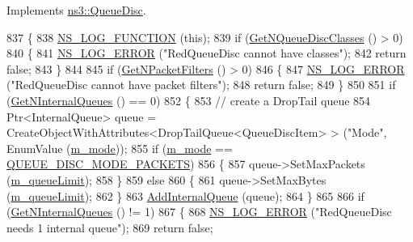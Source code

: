 Implements \hyperlink{classns3_1_1QueueDisc_ace6ef0c9afd0954c4629ad454bf975f5}{ns3\+::\+Queue\+Disc}.


\begin{DoxyCode}
837 \{
838   \hyperlink{log-macros-disabled_8h_a90b90d5bad1f39cb1b64923ea94c0761}{NS\_LOG\_FUNCTION} (\textcolor{keyword}{this});
839   \textcolor{keywordflow}{if} (\hyperlink{classns3_1_1QueueDisc_a8165c6afde992b073bc4d3bb283ed138}{GetNQueueDiscClasses} () > 0)
840     \{
841       \hyperlink{group__logging_ga0261a8db1d4ac5f79417d117634fd455}{NS\_LOG\_ERROR} (\textcolor{stringliteral}{"RedQueueDisc cannot have classes"});
842       \textcolor{keywordflow}{return} \textcolor{keyword}{false};
843     \}
844 
845   \textcolor{keywordflow}{if} (\hyperlink{classns3_1_1QueueDisc_aff24dd5be3fe3aa46b88c00659e09b23}{GetNPacketFilters} () > 0)
846     \{
847       \hyperlink{group__logging_ga0261a8db1d4ac5f79417d117634fd455}{NS\_LOG\_ERROR} (\textcolor{stringliteral}{"RedQueueDisc cannot have packet filters"});
848       \textcolor{keywordflow}{return} \textcolor{keyword}{false};
849     \}
850 
851   \textcolor{keywordflow}{if} (\hyperlink{classns3_1_1QueueDisc_a98e658dc1b0b32104ffc9e07afd205c6}{GetNInternalQueues} () == 0)
852     \{
853       \textcolor{comment}{// create a DropTail queue}
854       Ptr<InternalQueue> queue = CreateObjectWithAttributes<DropTailQueue<QueueDiscItem> > (\textcolor{stringliteral}{"Mode"}, 
      EnumValue (\hyperlink{classns3_1_1RedQueueDisc_aaff7adacb9ec0949e8e867fa27ea6c2c}{m\_mode}));
855       \textcolor{keywordflow}{if} (\hyperlink{classns3_1_1RedQueueDisc_aaff7adacb9ec0949e8e867fa27ea6c2c}{m\_mode} == \hyperlink{classns3_1_1RedQueueDisc_addca87c9127669da12f19adfe7d14a30a116c76aa54c1388fc5c2d75cebf577d3}{QUEUE\_DISC\_MODE\_PACKETS})
856         \{
857           queue->SetMaxPackets (\hyperlink{classns3_1_1RedQueueDisc_a421aec8e4b8cca06d16bfc5f8def2623}{m\_queueLimit});
858         \}
859       \textcolor{keywordflow}{else}
860         \{
861           queue->SetMaxBytes (\hyperlink{classns3_1_1RedQueueDisc_a421aec8e4b8cca06d16bfc5f8def2623}{m\_queueLimit});
862         \}
863       \hyperlink{classns3_1_1QueueDisc_a0599223e2a3976ef042a56c2923a2b61}{AddInternalQueue} (queue);
864     \}
865 
866   \textcolor{keywordflow}{if} (\hyperlink{classns3_1_1QueueDisc_a98e658dc1b0b32104ffc9e07afd205c6}{GetNInternalQueues} () != 1)
867     \{
868       \hyperlink{group__logging_ga0261a8db1d4ac5f79417d117634fd455}{NS\_LOG\_ERROR} (\textcolor{stringliteral}{"RedQueueDisc needs 1 internal queue"});
869       \textcolor{keywordflow}{return} \textcolor{keyword}{false};

\end{DoxyCode}
